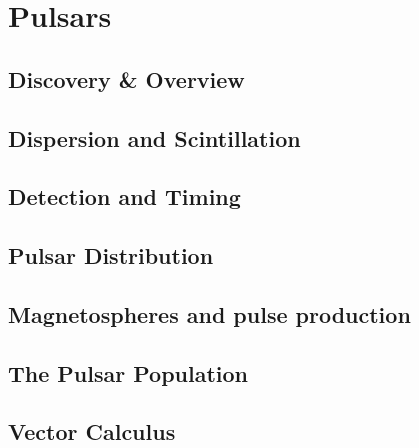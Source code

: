 \documentclass{momento}
\begin{document}


\part{Pulsars}
\label{part:pulsars}

\chapter{Discovery \& Overview}
\label{cha:discovery--overview}


\chapter{Dispersion and Scintillation}
\label{cha:disp-scint}


\chapter{Detection and Timing}
\label{cha:detection-timing}
%

\chapter{Pulsar Distribution}
\label{cha:pulsar-distribution}


\chapter{Magnetospheres and pulse production}
\label{cha:magn-pulse-prod}

\chapter{The Pulsar Population}
\label{cha:pulsar-population}


\appendices

\chapter{Vector Calculus}
\label{cha:vector-calculus}






\nocite{*}
\end{document}
